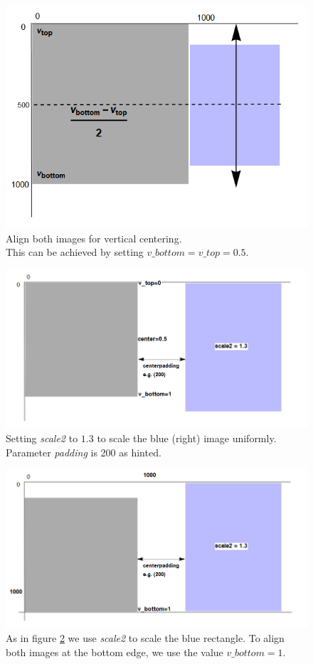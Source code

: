 \documentclass[a4paper, 12pt, bibliography=totoc]{scrartcl}
\begin{document}
\begin{figure}[H]
	\centering
	\includegraphics[width=0.8\linewidth]{images/svgjoinpad0centered.png}
	\caption[Align both images for vertical centering]{Align both images for vertical centering. \\
		This can be achieved by setting $v\_bottom=v\_top=0.5$.}
	\label{fig:svgjoinpad0centered}
\end{figure}

\begin{figure}[H]
	\centering
	\includegraphics[width=0.8\linewidth]{images/svgjoinscaled.png}
	\caption[Joining with scaling of $1.3$]{Setting \textit{scale2} to $1.3$ to scale the blue (right) image uniformly. Parameter \textit{padding} is 200 as hinted.}
	\label{fig:svgjoinscaled}
\end{figure}

\begin{figure}[H]
	\centering
	\includegraphics[width=0.8\linewidth]{images/svgjoinscaledbottom.png}
	\caption[Joining a scaled image aligned at the bottom edge]{As in figure \ref{fig:svgjoinscaled} we use \textit{scale2} to scale the blue rectangle. To align both images at the bottom edge, we use the value $v\_bottom=1$.}
	\label{fig:svgjoinscaledbottom}
\end{figure}
\end{document}
